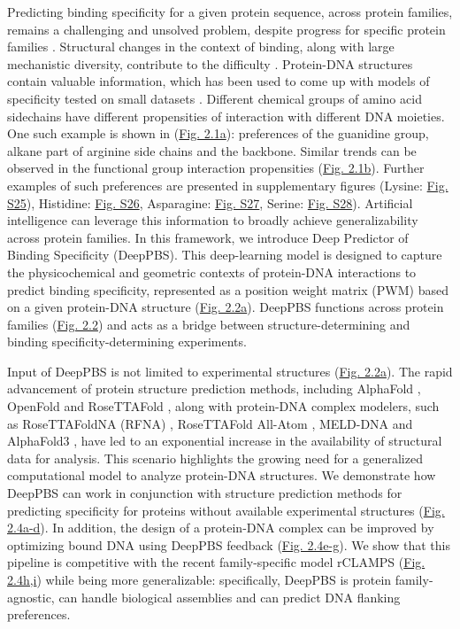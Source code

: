 Predicting binding specificity for a given protein sequence, across protein families, remains a challenging and unsolved problem, despite progress for specific protein families \citep{persikov2014novo, Wetzel2022, persikov2009predicting, Sofia2022, Meseguer2020, molparia2010zif, christensen2012recognition, Yanover2011}. Structural changes in the context of binding, along with large mechanistic diversity, contribute to the difficulty \citep{Slattery2014, Chiu2023}. Protein-DNA structures contain valuable information, which has been used to come up with models of specificity tested on small datasets \citep{morozov2005protein}. Different chemical groups of amino acid sidechains have different propensities of interaction with different DNA moieties. One such example is shown in (\hyperref[fig:arg]{Fig. 2.1a}): preferences of the guanidine group, alkane part of arginine side chains and the backbone. Similar trends can be observed in the functional group \citep{Chiu2023} interaction propensities (\hyperref[fig:arg]{Fig. 2.1b}). Further examples of such preferences are presented in supplementary figures (Lysine: \hyperref[fig:lys]{Fig. S25}), Histidine: \hyperref[fig:his]{Fig. S26}, Asparagine: \hyperref[fig:asn]{Fig. S27}, Serine: \hyperref[fig:ser]{Fig. S28}).
Artificial intelligence can leverage this information to broadly achieve generalizability across protein families. In this framework, we introduce Deep Predictor of Binding Specificity (DeepPBS). This deep-learning model is designed to capture the physicochemical and geometric contexts of protein-DNA interactions to predict binding specificity, represented as a position weight matrix (PWM) \citep{Stormo2013} based on a given protein-DNA structure (\hyperref[fig:pdna1]{Fig. 2.2a}). DeepPBS functions across protein families (\hyperref[fig:pdna1]{Fig. 2.2}) and acts as a bridge between structure-determining and binding specificity-determining experiments. 
\par
Input of DeepPBS is not limited to experimental structures (\hyperref[fig:pdna1]{Fig. 2.2a}). The rapid advancement of protein structure prediction methods, including AlphaFold \citep{Jumper2021}, OpenFold \citep{Ahdritz2024} and RoseTTAFold \citep{Baek2021}, along with protein-DNA complex modelers, such as RoseTTAFoldNA (RFNA) \citep{baek2024na}, RoseTTAFold All-Atom \citep{Krishna2024}, MELD-DNA \citep{Esmaeeli2023} and AlphaFold3 \citep{Abramson2024}, have led to an exponential increase in the availability of structural data for analysis. This scenario highlights the growing need for a generalized computational model to analyze protein-DNA structures. We demonstrate how DeepPBS can work in conjunction with structure prediction methods for predicting specificity for proteins without available experimental structures (\hyperref[fig:pdna3]{Fig. 2.4a-d}). In addition, the design of a protein-DNA complex can be improved by optimizing bound DNA using DeepPBS feedback (\hyperref[fig:pdna3]{Fig. 2.4e-g}). We show that this pipeline is competitive with the recent family-specific model rCLAMPS \citep{Wetzel2022} (\hyperref[fig:pdna3]{Fig. 2.4h,i}) while being more generalizable: specifically, DeepPBS is protein family-agnostic, can handle biological assemblies and can predict DNA flanking preferences.
